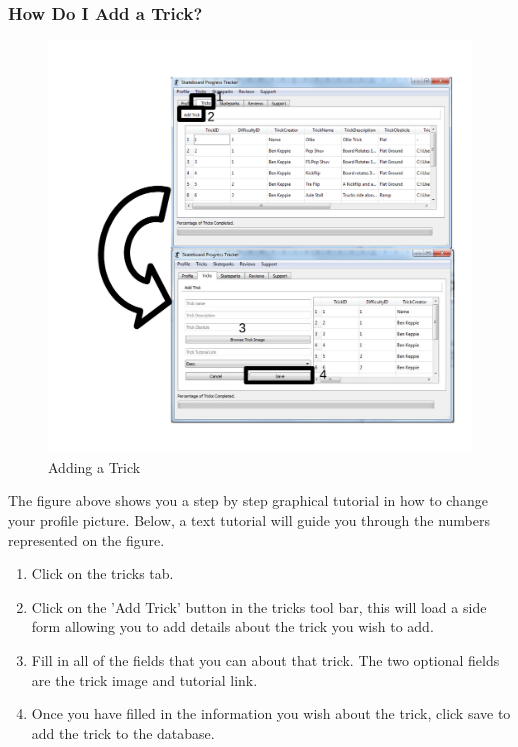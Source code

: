 \subsubsection{How Do I Add a Trick?}

\begin{figure}[H]
    \includegraphics[width=\textwidth]{./Manual/Images/AddTrick.pdf}
    \caption{Adding a Trick} \label{fig:Add Trick}
\end{figure}

The figure above shows you a step by step graphical tutorial in how to change your profile picture. Below, a text tutorial will guide you through the numbers represented on the figure.

\begin{enumerate}
\item Click on the tricks tab.
\item Click on the 'Add Trick' button in the tricks tool bar, this will load a side form allowing you to add details about the trick you wish to add.
\item Fill in all of the fields that you can about that trick. The two optional fields are the trick image and tutorial link.
\item Once you have filled in the information you wish about the trick, click save to add the trick to the database.
\end{enumerate}

